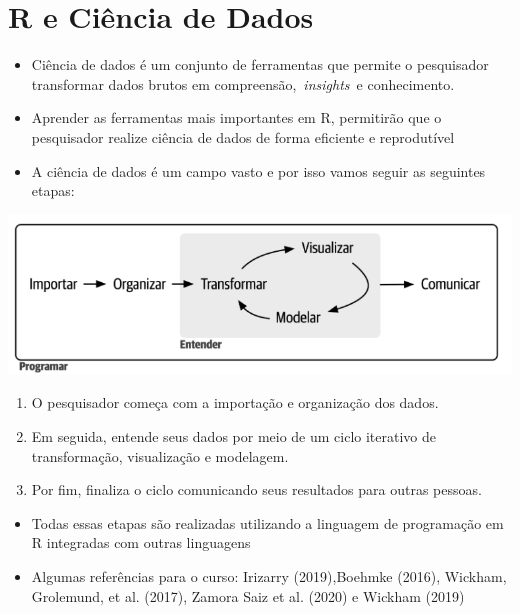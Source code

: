\documentclass[
  letterpaper,
  DIV=11,
  numbers=noendperiod]{scrartcl}
\begin{document}
\section{R e Ciência de Dados}\label{r-e-ciuxeancia-de-dados}

\begin{itemize}
\item
  Ciência de dados é um conjunto de ferramentas que permite o
  pesquisador transformar dados brutos em compreensão,~\emph{insights}~e
  conhecimento.
\item
  Aprender as ferramentas mais importantes em R, permitirão que o
  pesquisador realize ciência de dados de forma eficiente e reprodutível
\item
  A ciência de dados é um campo vasto e por isso vamos seguir as
  seguintes etapas:
\end{itemize}

\begin{center}
\includegraphics{Figuras/fases_da_CD.png}
\end{center}

\begin{enumerate}
\def\labelenumi{\arabic{enumi}.}
\item
  O pesquisador começa com a importação e organização dos dados.
\item
  Em seguida, entende seus dados por meio de um ciclo iterativo de
  transformação, visualização e modelagem.
\item
  Por fim, finaliza o ciclo comunicando seus resultados para outras
  pessoas.
\end{enumerate}

\begin{itemize}
\item
  Todas essas etapas são realizadas utilizando a linguagem de
  programação em R integradas com outras linguagens
\item
  Algumas referências para o curso: Irizarry (2019),Boehmke (2016),
  Wickham, Grolemund, et al. (2017), Zamora Saiz et al. (2020) e Wickham
  (2019)
\end{itemize}
\end{document}

